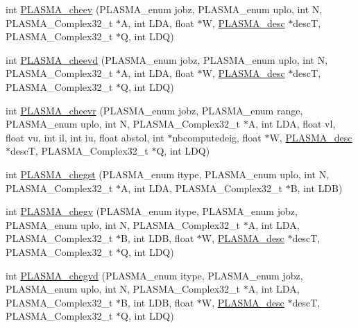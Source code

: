 \begin{DoxyCompactItemize}
\item 
int \hyperlink{group__PLASMA__Complex32__t_ga0d2fe45268be2c3d25593d80dd0c547f_ga0d2fe45268be2c3d25593d80dd0c547f}{P\+L\+A\+S\+M\+A\+\_\+cheev} (P\+L\+A\+S\+M\+A\+\_\+enum jobz, P\+L\+A\+S\+M\+A\+\_\+enum uplo, int N, P\+L\+A\+S\+M\+A\+\_\+\+Complex32\+\_\+t $\ast$A, int L\+D\+A, float $\ast$W, \hyperlink{structplasma__desc__t}{P\+L\+A\+S\+M\+A\+\_\+desc} $\ast$desc\+T, P\+L\+A\+S\+M\+A\+\_\+\+Complex32\+\_\+t $\ast$Q, int L\+D\+Q)
\item 
int \hyperlink{group__PLASMA__Complex32__t_ga73b59abe87bcb46382a26a50c70345ad_ga73b59abe87bcb46382a26a50c70345ad}{P\+L\+A\+S\+M\+A\+\_\+cheevd} (P\+L\+A\+S\+M\+A\+\_\+enum jobz, P\+L\+A\+S\+M\+A\+\_\+enum uplo, int N, P\+L\+A\+S\+M\+A\+\_\+\+Complex32\+\_\+t $\ast$A, int L\+D\+A, float $\ast$W, \hyperlink{structplasma__desc__t}{P\+L\+A\+S\+M\+A\+\_\+desc} $\ast$desc\+T, P\+L\+A\+S\+M\+A\+\_\+\+Complex32\+\_\+t $\ast$Q, int L\+D\+Q)
\item 
int \hyperlink{group__PLASMA__Complex32__t_ga69b1739ca8db9edc416275eaff7cab65_ga69b1739ca8db9edc416275eaff7cab65}{P\+L\+A\+S\+M\+A\+\_\+cheevr} (P\+L\+A\+S\+M\+A\+\_\+enum jobz, P\+L\+A\+S\+M\+A\+\_\+enum range, P\+L\+A\+S\+M\+A\+\_\+enum uplo, int N, P\+L\+A\+S\+M\+A\+\_\+\+Complex32\+\_\+t $\ast$A, int L\+D\+A, float vl, float vu, int il, int iu, float abstol, int $\ast$nbcomputedeig, float $\ast$W, \hyperlink{structplasma__desc__t}{P\+L\+A\+S\+M\+A\+\_\+desc} $\ast$desc\+T, P\+L\+A\+S\+M\+A\+\_\+\+Complex32\+\_\+t $\ast$Q, int L\+D\+Q)
\item 
int \hyperlink{group__PLASMA__Complex32__t_gac4b81a8ac8396c84a27d8a0b719bc379_gac4b81a8ac8396c84a27d8a0b719bc379}{P\+L\+A\+S\+M\+A\+\_\+chegst} (P\+L\+A\+S\+M\+A\+\_\+enum itype, P\+L\+A\+S\+M\+A\+\_\+enum uplo, int N, P\+L\+A\+S\+M\+A\+\_\+\+Complex32\+\_\+t $\ast$A, int L\+D\+A, P\+L\+A\+S\+M\+A\+\_\+\+Complex32\+\_\+t $\ast$B, int L\+D\+B)
\item 
int \hyperlink{group__PLASMA__Complex32__t_ga7d0aad7dba26173b3cc6f35a74f6eaf0_ga7d0aad7dba26173b3cc6f35a74f6eaf0}{P\+L\+A\+S\+M\+A\+\_\+chegv} (P\+L\+A\+S\+M\+A\+\_\+enum itype, P\+L\+A\+S\+M\+A\+\_\+enum jobz, P\+L\+A\+S\+M\+A\+\_\+enum uplo, int N, P\+L\+A\+S\+M\+A\+\_\+\+Complex32\+\_\+t $\ast$A, int L\+D\+A, P\+L\+A\+S\+M\+A\+\_\+\+Complex32\+\_\+t $\ast$B, int L\+D\+B, float $\ast$W, \hyperlink{structplasma__desc__t}{P\+L\+A\+S\+M\+A\+\_\+desc} $\ast$desc\+T, P\+L\+A\+S\+M\+A\+\_\+\+Complex32\+\_\+t $\ast$Q, int L\+D\+Q)
\item 
int \hyperlink{group__PLASMA__Complex32__t_ga7c4d8cc52849439d387178748f08d45b_ga7c4d8cc52849439d387178748f08d45b}{P\+L\+A\+S\+M\+A\+\_\+chegvd} (P\+L\+A\+S\+M\+A\+\_\+enum itype, P\+L\+A\+S\+M\+A\+\_\+enum jobz, P\+L\+A\+S\+M\+A\+\_\+enum uplo, int N, P\+L\+A\+S\+M\+A\+\_\+\+Complex32\+\_\+t $\ast$A, int L\+D\+A, P\+L\+A\+S\+M\+A\+\_\+\+Complex32\+\_\+t $\ast$B, int L\+D\+B, float $\ast$W, \hyperlink{structplasma__desc__t}{P\+L\+A\+S\+M\+A\+\_\+desc} $\ast$desc\+T, P\+L\+A\+S\+M\+A\+\_\+\+Complex32\+\_\+t $\ast$Q, int L\+D\+Q)

\end{DoxyCompactItemize}
